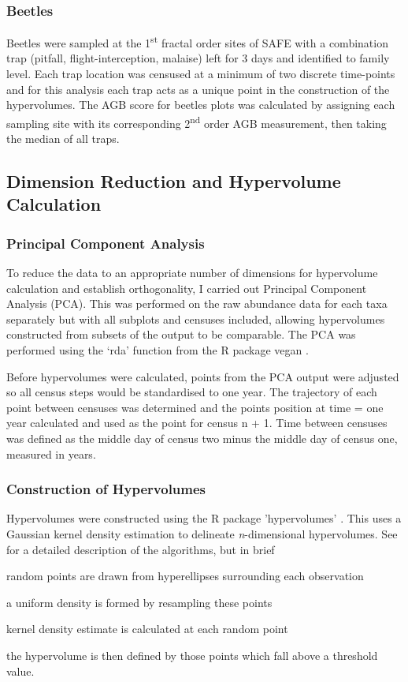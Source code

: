 	
	\subsubsection*{Beetles}
	
	Beetles were sampled at the 1\textsuperscript{st} fractal order sites of SAFE with a combination trap (pitfall, flight-interception, malaise) left for 3 days and identified to family level. Each trap location was censused at a minimum of two discrete time-points and for this analysis each trap acts as a unique point in the construction of the hypervolumes. The AGB score for beetles plots was calculated by assigning each sampling site with its corresponding 2\textsuperscript{nd} order AGB measurement, then taking the median of all traps.
		
\subsection{Dimension Reduction and Hypervolume Calculation}
	
	\subsubsection*{Principal Component Analysis}
    To reduce the data to an appropriate number of dimensions for hypervolume calculation and establish orthogonality, I carried out Principal Component Analysis (PCA). This was performed on the raw abundance data for each taxa separately but with all subplots and censuses included, allowing hypervolumes constructed from subsets of the output to be comparable. The PCA was performed using the `rda' function from the R package vegan \citep{Oksanen2018}.	
	
	Before hypervolumes were calculated, points from the PCA output were adjusted so all census steps would be standardised to one year. The trajectory of each point between censuses was determined and the points position at time = one year calculated and used as the point for census n + 1. Time between censuses was defined as the middle day of census two minus the middle day of census one, measured in years.
	
	\subsubsection*{Construction of Hypervolumes}
	Hypervolumes were constructed using the R package 'hypervolumes' \citep{Blonder2017a}. This uses a Gaussian kernel density estimation to delineate \emph{n}-dimensional hypervolumes. See \cite{Blonder2014, Blonder2017b} for a detailed description of the algorithms, but in brief
	\begin{enumerate*}[label=(\roman*)]
		\item random points are drawn from hyperellipses surrounding each observation
		\item a uniform density is formed by resampling these points
		\item kernel density estimate is calculated at each random point
		\item the hypervolume is then defined by those points which fall above a threshold value.
	\end{enumerate*}  
		
